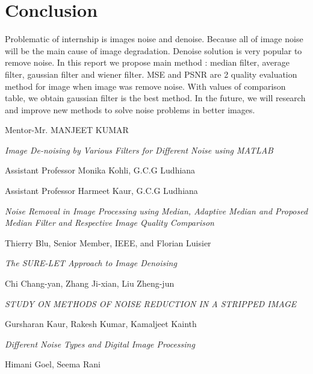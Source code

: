 \chapter{Conclusion}
Problematic of internship is images noise and denoise. Because all of image noise will be the main cause of image degradation. Denoise solution is very popular to remove noise. In this report we propose main method : median filter, average filter, gaussian filter and wiener filter. MSE and PSNR are 2 quality evaluation method for image when image was remove noise. With values of comparison table, we obtain gaussian filter is the best method. In the future, we will research and improve new methods to solve noise problems in better images.

\begin{thebibliography}{9}
	
	
	

    Mentor-Mr. MANJEET KUMAR

    	
    	\textit{Image De-noising by
    	Various Filters for
    	Different Noise using
    	MATLAB }

Assistant Professor Monika Kohli, G.C.G Ludhiana

Assistant Professor Harmeet Kaur, G.C.G Ludhiana

\textit{Noise Removal in Image Processing using Median, Adaptive Median and Proposed Median Filter and Respective Image Quality Comparison}

	Thierry Blu, Senior Member, IEEE, and Florian Luisier
	
	\textit{The SURE-LET Approach to Image Denoising}





Chi Chang-yan, Zhang Ji-xian, Liu Zheng-jun

\textit{STUDY ON METHODS OF NOISE REDUCTION IN A STRIPPED IMAGE}

Gursharan Kaur, Rakesh Kumar, Kamaljeet Kainth

\textit{Different Noise Types and Digital Image Processing}

Himani Goel, Seema Rani


\end{thebibliography}
